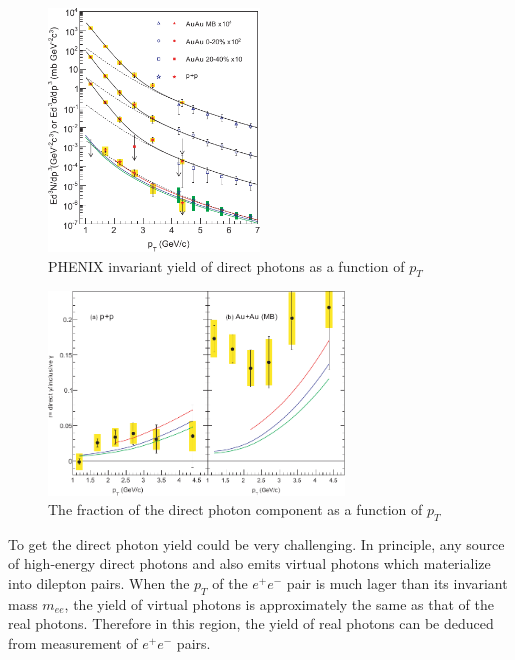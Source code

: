 \documentclass[11pt]{article} %
\begin{document}
\begin{figure}
    \centering
    \includegraphics[width=0.5\textwidth]{plots/direct_photon_spectrum.pdf}
    \caption{PHENIX invariant yield of direct photons as a function of $p_T$}
    \label{fig:inv_ph_yield}
\end{figure}

\begin{figure}
    \centering
    \includegraphics[width=0.7\textwidth]{plots/direct_photon_fraction.pdf}
    \caption{The fraction of the direct photon component as a function of $p_T$}
    \label{fig:inv_ph_r}
\end{figure}

To get the direct photon yield could be very challenging. In principle, any source of high-energy direct photons and also emits virtual photons which materialize into dilepton pairs. When the $p_T$ of the $e^+e^-$ pair is much lager than its invariant mass $m_{ee}$, the yield of virtual photons is approximately the same as that of the real photons. Therefore in this region, the yield of real photons can be deduced from measurement of $e^+e^-$ pairs.
\end{document}
